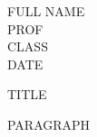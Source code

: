 \documentclass[12pt]{article}
\begin{document}
\begin{flushleft}
FULL NAME\\
PROF\\
CLASS\\
DATE\\
\end{flushleft}

\begin{center}
TITLE
\end{center}

\setlength{\parindent}{0.5in}
PARAGRAPH
\end{document}
